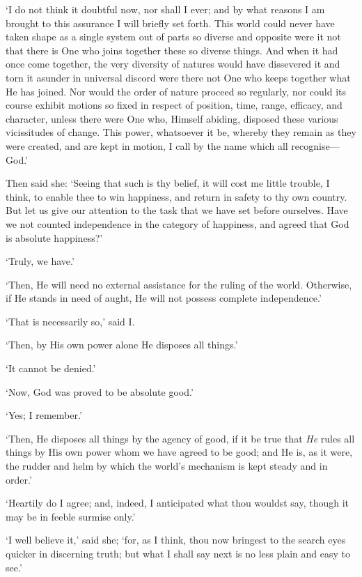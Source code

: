 \documentclass[12pt]{book}
\begin{document}
`I do not think it doubtful now, nor shall I ever; and by what reasons
I am brought to this assurance I will briefly set forth. This world
could never have taken shape as a single system out of parts so diverse
and opposite were it not that there is One who joins together these so
diverse things. And when it had once come together, the very diversity
of natures would have dissevered it and torn it asunder in universal
discord were there not One who keeps together what He has joined. Nor
would the order of nature proceed so regularly, nor could its course
exhibit motions so fixed in respect of position, time, range, efficacy,
and character, unless there were One who, Himself abiding, disposed
these various vicissitudes of change. This power, whatsoever it be,
whereby they remain as they were created, and are kept in motion, I call
by the name which all recognise---God.'

Then said she: `Seeing that such is thy belief, it will cost me little
trouble, I think, to enable thee to win happiness, and return in safety
to thy own country. But let us give our attention to the task that we
have set before ourselves. Have we not counted independence in the
category of happiness, and agreed that God is absolute happiness?'

`Truly, we have.'

`Then, He will need no external assistance for the ruling of the world.
Otherwise, if He stands in need of aught, He will not possess complete
independence.'

`That is necessarily so,' said I.

`Then, by His own power alone He disposes all things.'

`It cannot be denied.'

`Now, God was proved to be absolute good.'

`Yes; I remember.'

`Then, He disposes all things by the agency of good, if it be true that
\emph{He} rules all things by His own power whom we have agreed to be good;
and He is, as it were, the rudder and helm by which the world's
mechanism is kept steady and in order.'

`Heartily do I agree; and, indeed, I anticipated what thou wouldst say,
though it may be in feeble surmise only.'

`I well believe it,' said she; `for, as I think, thou now bringest to
the search eyes quicker in discerning truth; but what I shall say next
is no less plain and easy to see.'
\end{document}

